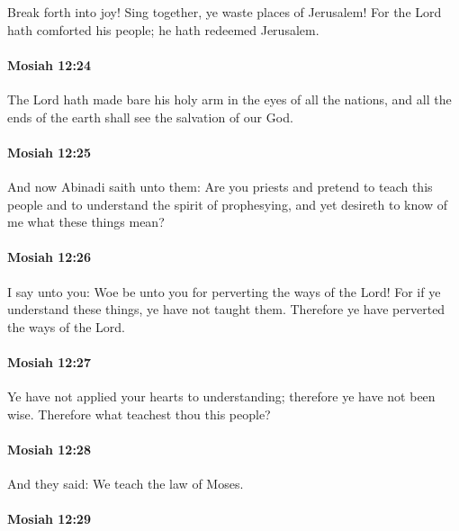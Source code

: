 			Break forth into joy!
			Sing together, ye waste places of Jerusalem!
			For the Lord hath comforted his people;
			he hath redeemed Jerusalem.

		\paragraph{Mosiah 12:24} %
			\label{MOSIAH-12-24}

			The Lord hath made bare his holy arm in the eyes of all the nations,
			and all the ends of the earth shall see the salvation of our God.

		\paragraph{Mosiah 12:25} %
			\label{MOSIAH-12-25}

			And now Abinadi saith unto them:
			Are you priests and pretend to teach this people
			and to understand the spirit of prophesying,
			and yet desireth to know of me what these things mean?

		\paragraph{Mosiah 12:26} %
			\label{MOSIAH-12-26}

			I say unto you:
			Woe be unto you for perverting the ways of the Lord!
			For if ye understand these things, ye have not taught them.
			Therefore ye have perverted the ways of the Lord.

		\paragraph{Mosiah 12:27} %
			\label{MOSIAH-12-27}

			Ye have not applied your hearts to understanding;
			therefore ye have not been wise.
			Therefore what teachest thou this people?

		\paragraph{Mosiah 12:28} %
			\label{MOSIAH-12-28}

			And they said:
			We teach the law of Moses.

		\paragraph{Mosiah 12:29} %
			\label{MOSIAH-12-29}

